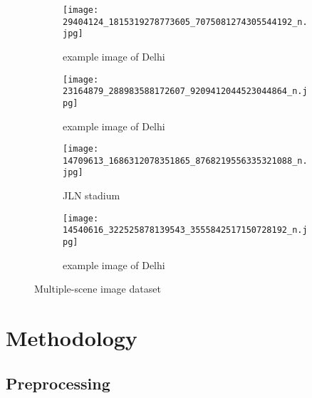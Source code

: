\documentclass{article}
\begin{document}
\begin{figure}[H]
\centering
\begin{subfigure}{.5\textwidth}
  \centering
  \texttt{[image: 29404124\_1815319278773605\_7075081274305544192\_n.jpg]}
  \caption{example image of Delhi}
\end{subfigure}%
\begin{subfigure}{.5\textwidth}
  \centering
  \texttt{[image: 23164879\_288983588172607\_9209412044523044864\_n.jpg]}
  \caption{example image of Delhi}
\end{subfigure}

\begin{subfigure}{.5\textwidth}
  \centering
  \texttt{[image: 14709613\_1686312078351865\_8768219556335321088\_n.jpg]}
  \caption{JLN stadium}
\end{subfigure}%
\begin{subfigure}{.5\textwidth}
  \centering
  \texttt{[image: 14540616\_322525878139543\_3555842517150728192\_n.jpg]}
  \caption{example image of Delhi}
\end{subfigure}
\caption{Multiple-scene image dataset}
\label{Multiple-scene image dataset}
\end{figure}

\newpage
\section{Methodology}
\label{sec:Methodology}

\subsection{Preprocessing}
\end{document}
